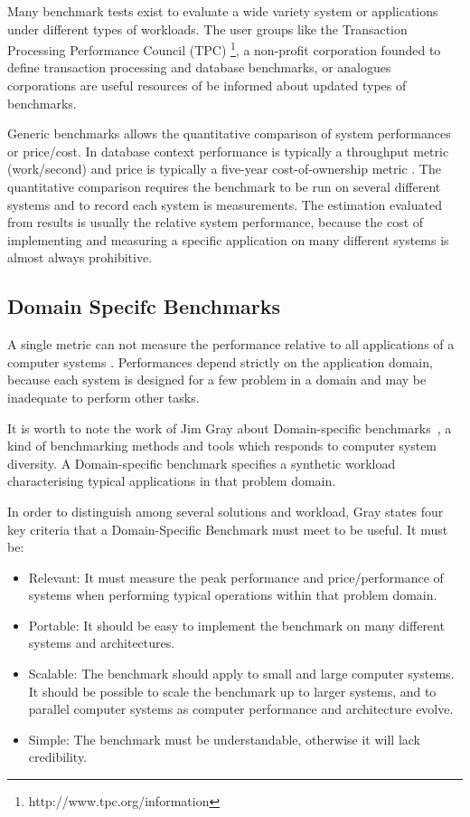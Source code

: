 Many benchmark tests exist to evaluate a wide variety system or applications under different types of workloads. The user groups like the Transaction Processing Performance Council (TPC) \footnote{http://www.tpc.org/information}, a non-profit corporation founded to define transaction processing and database benchmarks, or analogues corporations are useful resources of be informed about updated types of benchmarks. 

Generic benchmarks allows the quantitative comparison of system performances or price/cost. In database context performance is typically a throughput metric (work/second) and price is typically a five-year cost-of-ownership metric \cite{DBLP:books/mk/Gray93}. The quantitative comparison requires the benchmark to be run on several different systems and to record each system is measurements.  The estimation evaluated from results is usually the relative system performance, because the cost of implementing and measuring a specific application on many different systems is almost always prohibitive.

\subsection{Domain Specifc Benchmarks}  \label{sec:tcp}

A single metric can not measure the performance relative to all applications of a computer systems \cite{DBLP:books/mk/Gray93}. Performances depend strictly on the application domain, because each system is designed for a few problem in a domain and may be inadequate to perform other tasks.

It is worth to note the work of Jim Gray about Domain-specific benchmarks~\cite{DBLP:books/mk/Gray93}, a kind of benchmarking methods and tools  which responds to computer system diversity. A Domain-specific benchmark specifies a synthetic workload characterising typical applications in that problem domain. 

In order to distinguish among several solutions and workload, Gray states four key criteria that a Domain-Specific Benchmark must meet to be useful. It must be:
\begin{itemize}
\item Relevant: It must measure the peak performance and price/performance of systems when performing typical operations within that problem domain.
\item Portable: It should be easy to implement the benchmark on many different systems and architectures.
\item Scalable: The benchmark should apply to small and large computer systems. It should be possible to scale the benchmark up to larger systems, and to parallel computer systems as computer performance and architecture evolve.
\item Simple: The benchmark must be understandable, otherwise it will lack credibility.
\end{itemize} 

